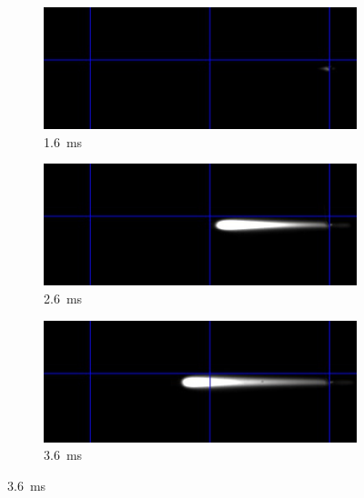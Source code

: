     \begin{figure}[h]
        \centering
        \begin{subfigure}[t]{0.47\textwidth}
            \centering
            \includegraphics[width=\textwidth]{assets/5 results/1msFrames/16.jpg}
            \caption{\qty{1.6}{ms}}
            \label{fig:growth_frames_16}
        \end{subfigure}
        \hfill
        \begin{subfigure}[t]{0.47\textwidth}
            \centering
            \includegraphics[width=\textwidth]{assets/5 results/1msFrames/26.jpg}
            \caption{\qty{2.6}{ms}}
            \label{fig:growth_frames_26}
        \end{subfigure}
        \hfill
        \begin{subfigure}[t]{0.47\textwidth}
            \centering
            \includegraphics[width=\textwidth]{assets/5 results/1msFrames/36.jpg}
            \caption{\qty{3.6}{ms}}
            \label{fig:growth_frames_36}

\end{subfigure}
\end{figure}
